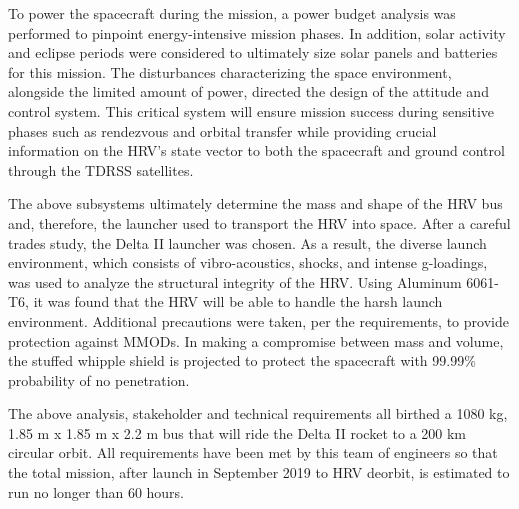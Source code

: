 \documentclass[paper=letter, fontsize=11pt]{scrartcl} %
\numberwithin{equation}{section} %
\numberwithin{figure}{section} %
\numberwithin{table}{section} %
\begin{document}
To power the spacecraft during the mission, a power budget analysis was performed to pinpoint energy-intensive mission phases. In addition, solar activity and eclipse periods were considered to ultimately size solar panels and batteries for this mission. The disturbances characterizing the space environment, alongside the limited amount of power, directed the design of the attitude and control system. This critical system will ensure mission success during sensitive phases such as rendezvous and orbital transfer while providing crucial information on the HRV's state vector to both the spacecraft and ground control through the TDRSS satellites.

The above subsystems ultimately determine the mass and shape of the HRV bus and, therefore, the launcher used to transport the HRV into space. After a careful trades study, the Delta II launcher was chosen. As a result, the diverse launch environment, which consists of vibro-acoustics, shocks, and intense g-loadings, was used to analyze the structural integrity of the HRV. Using Aluminum 6061-T6, it was found that the HRV will be able to handle the harsh launch environment. Additional precautions were taken, per the requirements, to provide protection against MMODs. In making a compromise between mass and volume, the stuffed whipple shield is projected to protect the spacecraft with 99.99\% probability of no penetration.

The above analysis, stakeholder and technical requirements all birthed a 1080 kg, 1.85 m x 1.85 m x 2.2 m bus that will ride the Delta II rocket to a 200 km circular orbit.  All requirements have been met by this team of engineers so that the total mission, after launch in September 2019 to HRV deorbit, is estimated to run no longer than 60 hours.


{}


\newpage
\appendix

% 


\end{document}
